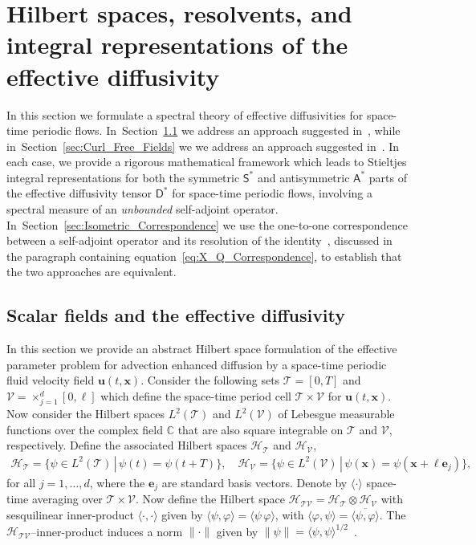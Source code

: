 \documentclass[leqno,onefignum,onetabnum]{siamltex1213}
\newcommand{\secref}[1]{Section~\ref{#1}}
\newcommand{\Tc}{\mathcal{T}}
\newcommand{\Vc}{\mathcal{V}}
\newcommand{\Dm}{\mathsf{D}}
\newcommand{\Sm}{\mathsf{S}}
\newcommand{\Am}{\mathsf{A}}
\newcommand{\Hs}{\mathscr{H}}
\newcommand{\vecx}{\boldsymbol{x}}
\newcommand{\vecu}{\boldsymbol{u}}
\newcommand{\vece}{\boldsymbol{e}}
\begin{document}
\section{Hilbert spaces, resolvents, and integral representations of the effective diffusivity}
\label{sec:Hilbert_Resolvent_Integral_Reps} 
%
In this section we formulate a spectral theory of effective
diffusivities for space-time periodic
flows. In~\secref{sec:Scalar_Fields} we address an approach suggested
in~\cite{Pavliotis:PHD_Thesis}, while in~\secref{sec:Curl_Free_Fields}
we we address an approach suggested in~\cite{Avellaneda:PRE:3249}. In 
each case, we provide a rigorous mathematical framework which leads to
Stieltjes integral representations for both the symmetric $\Sm^*$ and
antisymmetric $\Am^*$ parts of the effective diffusivity tensor
$\Dm^*$ for space-time periodic
flows, involving a spectral measure of an \emph{unbounded}
self-adjoint operator. In~\secref{sec:Isometric_Correspondence} we use
the one-to-one correspondence between a self-adjoint operator and its
resolution of the identity~\cite{Stone:64}, discussed in the paragraph
containing equation~\eqref{eq:X_Q_Correspondence}, to establish that
the two approaches are equivalent.  



\subsection{Scalar fields and the effective diffusivity}\label{sec:Scalar_Fields}
%
In this section we provide an abstract Hilbert space formulation of
the effective parameter problem for advection enhanced diffusion by a
space-time periodic fluid velocity field $\vecu(t,\vecx)$. Consider
the following sets $\Tc=[0,T]$ and $\Vc=\times_{j=1}^d[0,\ell]$ which 
define the space-time period cell $\Tc\times\Vc$ for $\vecu(t,\vecx)$. Now
consider the Hilbert spaces $L^2(\Tc)$ and $L^2(\Vc)$ of Lebesgue measurable
functions over the complex field $\mathbb{C}$ that are also square
integrable on $\Tc$ and $\Vc$, respectively. Define the associated
Hilbert spaces $\Hs_{\Tc}$ and $\Hs_{\Vc}$,
%
\begin{align}\label{eq:Hilbert_Spaces_scalar}
  \Hs_{\Tc}=\big\{\psi\in L^2(\Tc) \, | \, \psi(t)=\psi(t+T)\big\}, \quad
  \Hs_{\Vc}=\big\{\psi\in L^2(\Vc) \, | \, \psi(\vecx)=\psi(\vecx+\ell\vece_j)\big\},  
\end{align}
%
for all $j=1,\ldots,d$, where the $\vece_j$ are standard basis vectors. Denote by 
$\langle\cdot\rangle$ space-time averaging over $\Tc\times\Vc$. Now define the Hilbert space 
$\Hs_{\Tc\Vc}=\Hs_{\Tc}\otimes\Hs_{\Vc}$ with sesquilinear
inner-product $\langle\cdot,\cdot\rangle$ given by $\langle\psi,\varphi\rangle=\langle\psi\,\varphi\rangle$, with $\langle\varphi,\psi\rangle=\overline{\langle\psi,\varphi\rangle}$. The $\Hs_{\Tc\Vc}$--inner-product induces a norm $\|\cdot\|$ given by 
$\|\psi\|=\langle\psi,\psi\rangle^{1/2}$~\cite{Folland:99:RealAnalysis}. 
\end{document}
